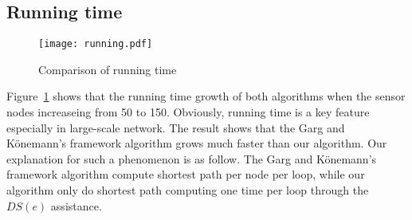 \documentclass{article}
\begin{document}
\subsection{Running time}

\begin{figure}[H]
\centering
\texttt{[image: running.pdf]} 
\caption{Comparison of running time}
\label{f2}
\end{figure}
Figure~\ref{f2} shows that the running time growth of both algorithms when the sensor nodes increaseing from 50 to 150. Obviously, running time is a key feature especially in large-scale network. The result shows that the Garg and K\"{o}nemann's framework algorithm 
grows much faster than our algorithm. Our explanation for such a phenomenon is as follow. The Garg and K\"{o}nemann's framework algorithm compute shortest path per node per loop, while our algorithm only do shortest path computing one time per loop through the $DS(e)$ assistance. 




\end{document}
